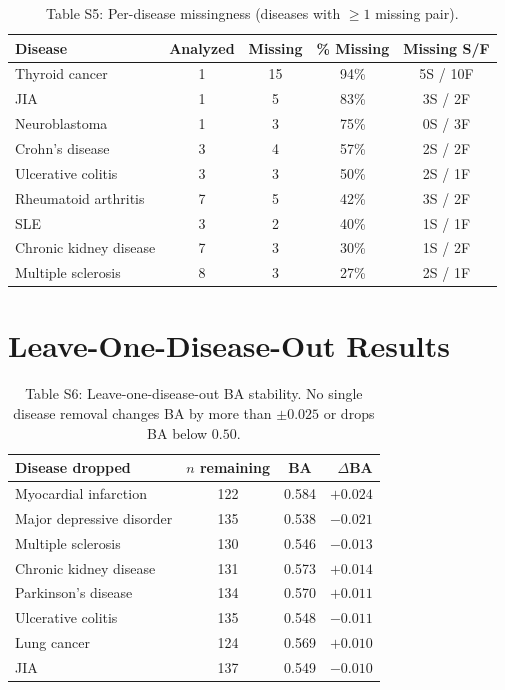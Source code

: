 \documentclass[11pt]{article}
\begin{document}
\vspace{1em}
\begin{table}[H]
\centering
\caption{Table S5: Per-disease missingness (diseases with $\geq 1$ missing pair).}
\label{tab:miss_disease}
\small
\begin{tabular}{lcccc}
\toprule
Disease & Analyzed & Missing & \% Missing & Missing S/F \\
\midrule
Thyroid cancer & 1 & 15 & 94\% & 5S / 10F \\
JIA & 1 & 5 & 83\% & 3S / 2F \\
Neuroblastoma & 1 & 3 & 75\% & 0S / 3F \\
Crohn's disease & 3 & 4 & 57\% & 2S / 2F \\
Ulcerative colitis & 3 & 3 & 50\% & 2S / 1F \\
Rheumatoid arthritis & 7 & 5 & 42\% & 3S / 2F \\
SLE & 3 & 2 & 40\% & 1S / 1F \\
Chronic kidney disease & 7 & 3 & 30\% & 1S / 2F \\
Multiple sclerosis & 8 & 3 & 27\% & 2S / 1F \\
\bottomrule
\end{tabular}
\end{table}

\section{Leave-One-Disease-Out Results}
\label{supp:lodo}

\vspace{1em}
\begin{table}[H]
\centering
\caption{Table S6: Leave-one-disease-out BA stability. No single disease removal changes BA by more than $\pm 0.025$ or drops BA below $0.50$.}
\label{tab:lodo}
\small
\begin{tabular}{lccr}
\toprule
Disease dropped & $n$ remaining & BA & $\Delta$BA \\
\midrule
Myocardial infarction & 122 & 0.584 & $+0.024$ \\
Major depressive disorder & 135 & 0.538 & $-0.021$ \\
Multiple sclerosis & 130 & 0.546 & $-0.013$ \\
Chronic kidney disease & 131 & 0.573 & $+0.014$ \\
Parkinson's disease & 134 & 0.570 & $+0.011$ \\
Ulcerative colitis & 135 & 0.548 & $-0.011$ \\
Lung cancer & 124 & 0.569 & $+0.010$ \\
JIA & 137 & 0.549 & $-0.010$ \\
\bottomrule
\end{tabular}
\end{table}
\end{document}
